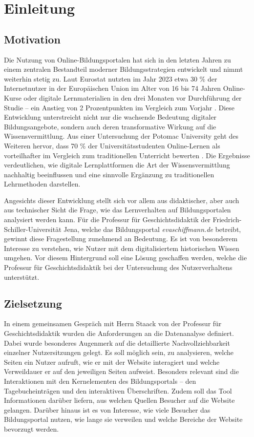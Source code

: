 \chapter{Einleitung}
\label{ch:einleitung}

\section{Motivation}
\label{sec:motivation}

Die Nutzung von Online-Bildungsportalen hat sich in den letzten Jahren zu einem zentralen Bestandteil moderner Bildungsstrategien entwickelt und nimmt weiterhin stetig zu. Laut Eurostat nutzten im Jahr 2023 etwa 30 \% der Internetnutzer in der Europäischen Union im Alter von 16 bis 74 Jahren Online-Kurse oder digitale Lernmaterialien
in den drei Monaten vor Durchführung der Studie – ein Anstieg von 2 Prozentpunkten im Vergleich zum Vorjahr \parencite{Eurostat}. Diese Entwicklung unterstreicht nicht nur die wachsende Bedeutung digitaler Bildungsangebote, sondern auch deren transformative Wirkung auf die Wissensvermittlung. Aus einer Untersuchung der Potomac University geht des Weiteren hervor, dass 70 \% der Universitätsstudenten Online-Lernen als vorteilhafter im Vergleich zum traditionellen Unterricht bewerten \parencite{Potomac}. Die Ergebnisse verdeutlichen, wie digitale Lernplattformen die Art der Wissensvermittlung nachhaltig beeinflussen und eine sinnvolle Ergänzung zu traditionellen Lehrmethoden darstellen.

Angesichts dieser Entwicklung stellt sich vor allem aus didaktischer, aber auch aus technischer Sicht die Frage, wie das Lernverhalten auf Bildungsportalen analysiert werden kann. Für die Professur für Geschichtsdidaktik der Friedrich-Schiller-Universität Jena, welche das Bildungsportal \textit{evaschiffmann.de} betreibt, gewinnt diese Fragestellung zunehmend an Bedeutung. Es ist von besonderem Interesse zu verstehen, wie Nutzer mit dem digitalisiertem historischen Wissen umgehen. Vor diesem Hintergrund soll eine Lösung geschaffen werden, welche die Professur für Geschichtsdidaktik bei der Untersuchung des Nutzerverhaltens unterstützt.

\section{Zielsetzung}
\label{sec:zielsetzung}

In einem gemeinsamen Gespräch mit Herrn Staack von der Professur für Geschichtsdidaktik wurden die Anforderungen an die Datenanalyse definiert. Dabei wurde besonderes Augenmerk auf die detaillierte Nachvollziehbarkeit einzelner Nutzersitzungen gelegt. Es soll möglich sein, zu analysieren, welche Seiten ein Nutzer aufruft, wie er mit der Website interagiert und welche Verweildauer er auf den jeweiligen Seiten aufweist. Besonders relevant sind die Interaktionen mit den Kernelementen des Bildungsportals – den Tagebucheinträgen und den interaktiven Überschriften. Zudem soll das Tool Informationen darüber liefern, aus welchen Quellen Besucher auf die Website gelangen. Darüber hinaus ist es von Interesse, wie viele Besucher das Bildungsportal nutzen, wie lange sie verweilen und welche Bereiche der Website bevorzugt werden.

